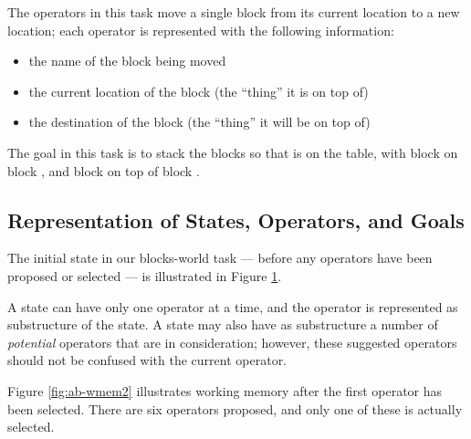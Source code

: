 The operators in this task move a single block from its current location to a
new location; each operator is represented with the following information: 
\vspace{-12pt}
\begin{itemize}
\item the name of the block being moved \vspace{-9pt}
\item the current location of the block (the ``thing'' it is on top of) \vspace{-9pt}
\item the destination of the block (the ``thing'' it will be on top of) 
\vspace{-9pt}
\end{itemize}

The goal in this task is to stack the blocks so that  is on the
table, with block  on block , and block  on
top of block .

\subsection{Representation of States, Operators, and Goals}
\label{OVERVIEW-ps-representation}

The initial state in our blocks-world task --- before any operators have been
proposed or selected --- is illustrated in Figure \ref{fig:ab-wmem}.

\begin{figure}
\label{fig:ab-wmem}
\end{figure}

A state can have only one operator at a time, and the operator is represented
as substructure of the state. A state may also have as substructure a number
of \emph{potential} operators that are in consideration; however, these
suggested operators should not be confused with the current operator. 

Figure \ref{fig:ab-wmem2} illustrates working memory after the first operator
has been selected. There are six operators proposed, and only one of
these is actually selected.

